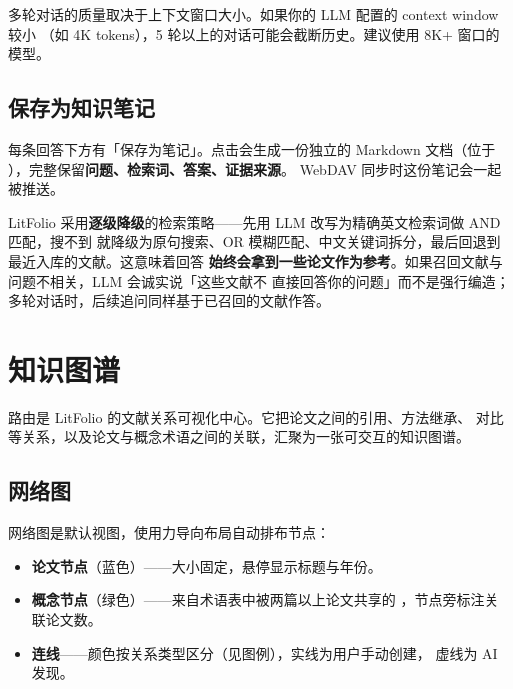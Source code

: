 \begin{tipbox}
多轮对话的质量取决于上下文窗口大小。如果你的 LLM 配置的 context window 较小
（如 4K tokens），5 轮以上的对话可能会截断历史。建议使用 8K+ 窗口的模型。
\end{tipbox}

\section{保存为知识笔记}

每条回答下方有「保存为笔记」。点击会生成一份独立的 Markdown 文档（位于
），完整保留\textbf{问题、检索词、答案、证据来源}。
WebDAV 同步时这份笔记会一起被推送。

\begin{tipbox}
LitFolio 采用\textbf{逐级降级}的检索策略——先用 LLM 改写为精确英文检索词做 AND 匹配，搜不到
就降级为原句搜索、OR 模糊匹配、中文关键词拆分，最后回退到最近入库的文献。这意味着回答
\textbf{始终会拿到一些论文作为参考}。如果召回文献与问题不相关，LLM 会诚实说「这些文献不
直接回答你的问题」而不是强行编造；多轮对话时，后续追问同样基于已召回的文献作答。
\end{tipbox}

\chapter{知识图谱}
\label{ch:graph}

 路由是 LitFolio 的文献关系可视化中心。它把论文之间的引用、方法继承、
对比等关系，以及论文与概念术语之间的关联，汇聚为一张可交互的知识图谱。

\section{网络图}


网络图是默认视图，使用力导向布局自动排布节点：

\begin{itemize}
  \item \textbf{论文节点}（蓝色）——大小固定，悬停显示标题与年份。
  \item \textbf{概念节点}（绿色）——来自术语表中被两篇以上论文共享的
    ，节点旁标注关联论文数。
  \item \textbf{连线}——颜色按关系类型区分（见图例），实线为用户手动创建，
    虚线为 AI 发现。
\end{itemize}

